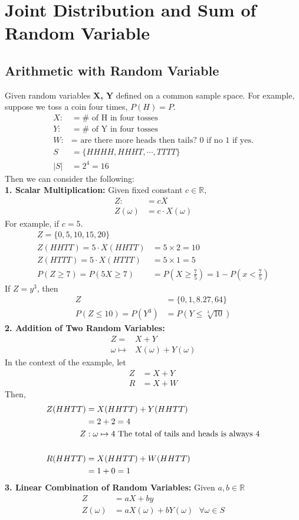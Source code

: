 \documentclass[11pt,oneside]{book}
\theoremstyle{break}
\theoremstyle{break}
\begin{document}
\chapter[Joint Distribution and Sum of Random Variable]{Joint Distribution and Sum of Random Variable}
\section[Arithmetic with Random Variable]{\color{DarkOrchid}Arithmetic with Random Variable\color{black} }
Given random variables \textbf{X, Y} defined on a common sample space. For example, suppose we toss a coin four times, $P(H)=P$. \begin{align*}
X:&=\#\text{ of H  in four tosses}\\
Y:&=\#\text{ of Y  in four tosses}\\
W:&=\text{ are there more heads then tails? 0 if no 1 if yes.}
\\S&=\{HHHH,HHHT,\cdots,TTTT\}\\
|S|&=2^4=16
\end{align*} Then we can consider the following: \\
\textbf{1. Scalar Multiplication:} Given fixed constant $c\in \mathbb{R},$ \begin{align*}
Z:&=cX\\
Z(\omega)&=c\cdot X(\omega)
\end{align*}
For example, if $c=5.$\begin{align*}
Z=\{0,5,10,15,20\}\\
Z(HHTT)=5\cdot X(HHTT)&=5\times 2 =10\\
Z(HTTT)=5\cdot X(HTTT)&=5\times 1 =5\\
P(Z\geq 7)=P(5X\geq 7)&=P(X\geq \frac{7}{5})=1-P(x<\frac{7}{5})
\end{align*}
If $Z=y^3$, then \begin{align*}
Z&=\{0,1,8.27,64\}\\
P(Z\leq 10)=P(Y^3)&=P(Y\leq \sqrt[3]{10})
\end{align*}
\textbf{2. Addition of Two Random Variables:}\begin{align*}
Z=&X+Y\\
\omega \mapsto &X(\omega)+Y(\omega)
\end{align*}
In the context of the example, let \begin{align*}
Z&=X+Y\\
R&=X+W
\end{align*}
Then, \begin{align*}
Z(HHTT)&=X(HHTT)+Y(HHTT)\\
&=2+2=4\\
Z&:\omega \mapsto 4\text{ The total of tails and heads is always 4}\\
\hfill\\
R(HHTT)&=X(HHTT)+W(HHTT)\\
&=1+0=1
\end{align*}
\textbf{3. Linear Combination of Random Variables:} Given $a,b\in \mathbb{R}$\begin{align*}
Z&=aX+by\\
Z(\omega)&=aX(\omega)+bY(\omega)\text{ }\forall \omega \in S
\end{align*}
\newpage
\end{document}
